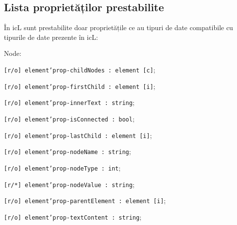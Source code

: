 \subsection{Lista proprietăților prestabilite}
\label{elements:predefined:properties}

În icL sunt prestabilite doar proprietățile ce au tipuri de date compatibile cu tipurile de date prezente în icL:
\begin{icItems}
	\item Node:	
	\begin{icItems}
		\item \texttt{[r/o] element'prop-childNodes : element [c]};
		\item \texttt{[r/o] element'prop-firstChild : element [i]};
		\item \texttt{[r/o] element'prop-innerText : string};
		\item \texttt{[r/o] element'prop-isConnected : bool};
		\item \texttt{[r/o] element'prop-lastChild : element [i]};
		\item \texttt{[r/o] element'prop-nodeName : string};
		\item \texttt{[r/o] element'prop-nodeType : int};
		\item \texttt{[r/*] element'prop-nodeValue : string};
		\item \texttt{[r/o] element'prop-parentElement : element [i]};
		\item \texttt{[r/o] element'prop-textContent : string};
	\end{icItems}
	

\end{icItems}

